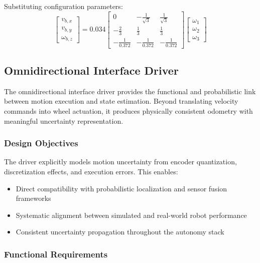 Substituting configuration parameters:
\begin{equation}
\begin{bmatrix} v_{b,x} \\ v_{b,y} \\ \omega_{b,z} \end{bmatrix} = 0.034 \begin{bmatrix} 0 & -\frac{1}{\sqrt{3}} & \frac{1}{\sqrt{3}} \\ -\frac{2}{3} & \frac{1}{3} & \frac{1}{3} \\ -\frac{1}{0.372} & -\frac{1}{0.372} & -\frac{1}{0.372} \end{bmatrix} \begin{bmatrix} \omega_1 \\ \omega_2 \\ \omega_3 \end{bmatrix}
\label{eq:fk_numerical}
\end{equation}

\subsection{Omnidirectional Interface Driver}
\label{subsec:omni_interface_driver}

The omnidirectional interface driver provides the functional and probabilistic link between motion execution and state estimation. Beyond translating velocity commands into wheel actuation, it produces physically consistent odometry with meaningful uncertainty representation.

\subsubsection{Design Objectives}

The driver explicitly models motion uncertainty from encoder quantization, discretization effects, and execution errors. This enables:
\begin{itemize}
    \item Direct compatibility with probabilistic localization and sensor fusion frameworks
    \item Systematic alignment between simulated and real-world robot performance
    \item Consistent uncertainty propagation throughout the autonomy stack
\end{itemize}

\subsubsection{Functional Requirements}

